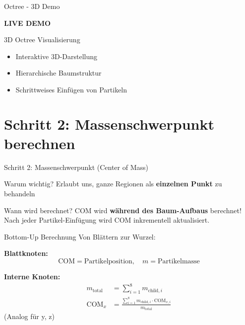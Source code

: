 \documentclass[xcolor=dvipsnames]{beamer}
\begin{document}
\begin{frame}{Octree - 3D Demo}
\begin{center}
\vspace{2cm}
{\Huge \textbf{LIVE DEMO}}

\vspace{1cm}
{\Large 3D Octree Visualisierung}

\vspace{0.5cm}
\begin{itemize}
    \item Interaktive 3D-Darstellung
    \item Hierarchische Baumstruktur
    \item Schrittweises Einfügen von Partikeln
\end{itemize}
\end{center}
\end{frame}

\section{Schritt 2: Massenschwerpunkt berechnen}

\begin{frame}{Schritt 2: Massenschwerpunkt (Center of Mass)}
\begin{block}{Warum wichtig?}
Erlaubt uns, ganze Regionen als \textbf{einzelnen Punkt} zu behandeln
\end{block}

\begin{alertblock}{Wann wird berechnet?}
COM wird \textbf{während des Baum-Aufbaus} berechnet! \\
Nach jeder Partikel-Einfügung wird COM inkrementell aktualisiert.
\end{alertblock}

\begin{block}{Bottom-Up Berechnung}
Von Blättern zur Wurzel:
\end{block}

\textbf{Blattknoten:}
\begin{equation}
\text{COM} = \text{Partikelposition}, \quad m = \text{Partikelmasse}
\end{equation}

\textbf{Interne Knoten:}
\begin{align}
m_{\text{total}} &= \sum_{i=1}^{8} m_{\text{child},i} \\
\text{COM}_x &= \frac{\sum_{i=1}^{8} m_{\text{child},i} \cdot \text{COM}_{x,i}}{m_{\text{total}}}
\end{align}
(Analog für y, z)
\end{frame}
\end{document}
